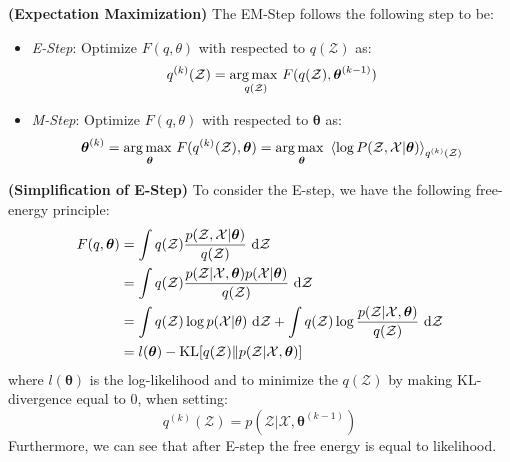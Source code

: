\begin{definition}{\textbf{(Expectation Maximization)}}
    The EM-Step follows the following step to be:
    \begin{itemize}
        \item \emph{E-Step}: Optimize $F(q, \theta)$ with respected to $q(\mathcal{Z})$ as:
        \begin{equation*}
            q^{(k)}(\mathcal{Z}) = \underset{q(\mathcal{Z})}{\arg\max \ }F(q(\mathcal{Z}), \boldsymbol \theta^{(k-1)})
        \end{equation*}
        \item \emph{M-Step}: Optimize $F(q, \theta)$ with respected to $\boldsymbol \theta$ as:
        \begin{equation*}
            \boldsymbol \theta^{(k)} = \underset{\boldsymbol \theta}{\arg\max \ }F(q^{(k)}(\mathcal{Z}), \boldsymbol \theta) = \underset{\boldsymbol \theta}{\arg\max \ }\left\langle \log P(\mathcal{Z}, \mathcal{X} | \boldsymbol \theta) \right\rangle_{q^{(k)}(\mathcal{Z})}
        \end{equation*}
    \end{itemize}
\end{definition}

\begin{remark}{\textbf{(Simplification of E-Step)}}
    To consider the E-step, we have the following free-energy principle:
    \begin{equation*}
    \begin{aligned}
        F(q, \boldsymbol \theta) &= \int q(\mathcal{Z})\frac{p(\mathcal{Z}, \mathcal{X} | \boldsymbol \theta)}{q(\mathcal{Z})}\ \mathrm{d}\mathcal{Z} \\ 
        &= \int q(\mathcal{Z})\frac{p(\mathcal{Z} | \mathcal{X}, \boldsymbol \theta)p(\mathcal{X}|\boldsymbol \theta)}{q(\mathcal{Z})}\ \mathrm{d}\mathcal{Z} \\ 
        &= \int q(\mathcal{Z})\log p(\mathcal{X}|\theta)\ \mathrm{d}\mathcal{Z} + \int q(\mathcal{Z})\log\frac{p(\mathcal{Z} | \mathcal{X}, \boldsymbol \theta)}{q(\mathcal{Z})}\ \mathrm{d}\mathcal{Z} \\ 
        &= l(\boldsymbol \theta) - \operatorname{KL}[q(\mathcal{Z}) \| p(\mathcal{Z} | \mathcal{X}, \boldsymbol \theta) ]
    \end{aligned}
    \end{equation*}
    where $l(\boldsymbol \theta)$ is the log-likelihood and to minimize the $q(\mathcal{Z})$ by making KL-divergence equal to $0$, when setting:
    \begin{equation*}
        q^{(k)}(\mathcal{Z}) = p(\mathcal{Z} | \mathcal{X}, \boldsymbol \theta^{(k-1)}) 
    \end{equation*}
    Furthermore, we can see that after E-step the free energy is equal to likelihood. 
\end{remark}

